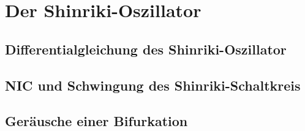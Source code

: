 

\section{Der Shinriki-Oszillator}
\label{sec:shinrikiOszi}

\subsection{Differentialgleichung des Shinriki-Oszillator}
\label{sub:dgl}

\subsection{NIC und Schwingung des Shinriki-Schaltkreis}
\label{sub:nic}

\subsection{Geräusche einer Bifurkation}
\label{sub:tonBifurkation}